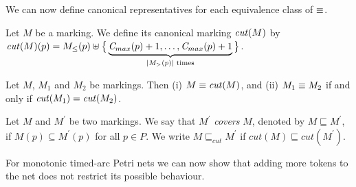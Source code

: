 We can now define canonical representatives for each
equivalence class of $\equiv$. 

\begin{definition}[Cut]
\label{def:cut}
Let $M$ be a marking.
We define its canonical marking $\mathit{cut}(M)$ by 
$\mathit{cut}(M)(p)= M_{\leq}(p)\uplus \big\{ \underbrace{ \mathit{C}_{max}(p)+1,\dots ,\mathit{C}_{max}(p)+1 }_{|M_{>}(p)| \text{ times}} \big\}$.
\end{definition}

\begin{lemma}
\label{lemma:canon}
Let $M$, $M_1$ and $M_2$ be markings. Then
(i) $M \equiv \mathit{cut}(M)$, and (ii)
$M_1 \equiv M_2$ if and only if $\mathit{cut}(M_1)=\mathit{cut}(M_2)$.
\end{lemma}

Let $M$ and $M^\prime$ be two markings. We say that $M^\prime$ \emph{covers} 
$M$, denoted by $M \sqsubseteq M^\prime$, if $M(p) \subseteq M^\prime(p)$ 
for all $p \in P$. We write $M \sqsubseteq_{cut} M^\prime$ 
if $cut(M) \sqsubseteq cut(M^\prime)$.

For monotonic timed-arc Petri nets we can now show that adding more tokens
to the net does not restrict its possible behaviour. 

